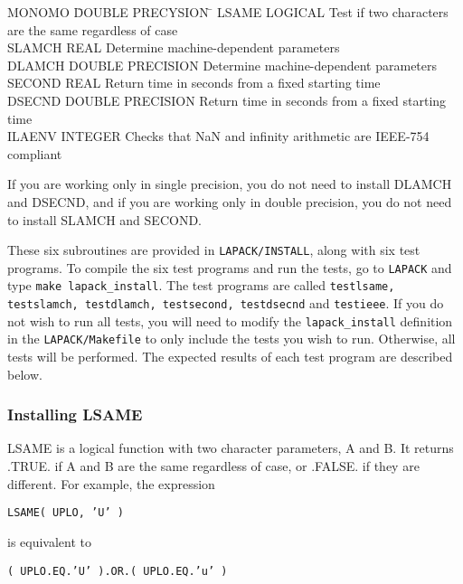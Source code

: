 \documentclass[11pt]{report}
\begin{document}
\begin{tabbing}
MONOMO  \=  DOUBLE PRECYSION  \=  \kill
LSAME   \>  LOGICAL      \> Test if two characters are the same regardless of case \\
SLAMCH  \>  REAL  \> Determine machine-dependent parameters \\
DLAMCH  \>  DOUBLE PRECISION \> Determine machine-dependent parameters \\
SECOND  \>  REAL  \> Return time in seconds from a fixed starting time \\
DSECND  \>  DOUBLE PRECISION  \> Return time in seconds from a fixed starting time\\
ILAENV  \>  INTEGER \> Checks that NaN and infinity arithmetic are IEEE-754 compliant
\end{tabbing}

\noindent
If you are working only in single precision, you do not need to install
DLAMCH and DSECND, and if you are working only in double precision,
you do not need to install SLAMCH and SECOND.

These six subroutines are provided in \texttt{LAPACK/INSTALL},
along with six test programs.
To compile the six test programs and run the tests, go to \texttt{LAPACK} and
type \texttt{make lapack\_install}.  The test programs are called
\texttt{testlsame, testslamch, testdlamch, testsecond, testdsecnd} and
\texttt{testieee}.
If you do not wish to run all tests, you will need to modify the 
\texttt{lapack\_install} definition in the \texttt{LAPACK/Makefile} to only include the
tests you wish to run.  Otherwise, all tests will be performed.
The expected results of each test program are described below.

\subsubsection{Installing LSAME}

LSAME is a logical function with two character parameters, A and B.
It returns .TRUE. if A and B are the same regardless of case, or .FALSE.
if they are different. 
For example, the expression

\begin{list}{}{} 
\item \texttt{LSAME( UPLO, 'U' )}
\end{list}
\noindent 
is equivalent to
\begin{list}{}{} 
\item \texttt{( UPLO.EQ.'U' ).OR.( UPLO.EQ.'u' )}
\end{list} 
 
\end{document}
